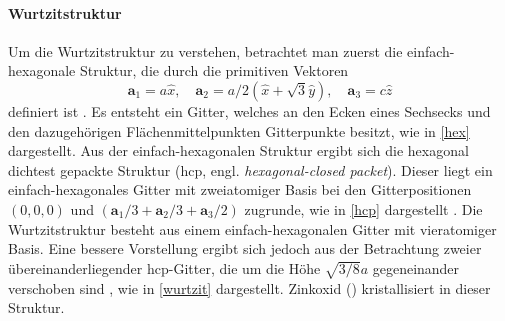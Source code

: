 \paragraph{Wurtzitstruktur}
Um die Wurtzitstruktur zu verstehen, betrachtet man zuerst die einfach-hexagonale Struktur, die durch die primitiven
Vektoren
\begin{equation}
    \mathbf{a}_1 = a\hat{x}, \quad
    \mathbf{a}_2 = a/2 (\hat{x} + \sqrt{3} \hat{y}), \quad
    \mathbf{a}_3 = c \hat{z}
    \label{eq:hex}
\end{equation}
definiert ist \autocite{Ashcroft}.
Es entsteht ein Gitter, welches an den Ecken eines Sechsecks und den dazugehörigen Flächenmittelpunkten Gitterpunkte
besitzt, wie in \cref{hex} dargestellt.
Aus der einfach-hexagonalen Struktur ergibt sich die hexagonal dichtest gepackte Struktur
(hcp, engl. \textit{hexagonal-closed packet}).
Dieser liegt ein einfach-hexagonales Gitter mit zweiatomiger Basis bei den Gitterpositionen $(0,0,0)$ und
$(\mathbf{a}_1/3 + \mathbf{a}_2/3 + \mathbf{a}_3/2)$ zugrunde, wie in \cref{hcp} dargestellt \autocite{Ashcroft}.
Die Wurtzitstruktur besteht aus einem einfach-hexagonalen Gitter mit vieratomiger Basis.
Eine bessere Vorstellung ergibt sich jedoch aus der Betrachtung zweier übereinanderliegender hcp-Gitter, die um
die Höhe $\sqrt {3 / 8} a$ gegeneinander verschoben sind \autocite{Grundmann}, wie in \cref{wurtzit} dargestellt.
Zinkoxid () kristallisiert in dieser Struktur.

